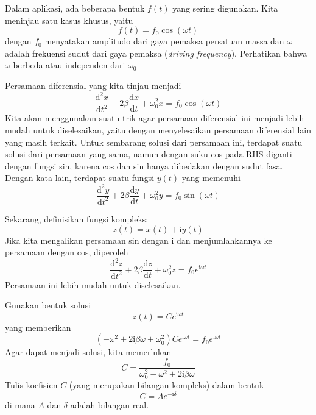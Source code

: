 Dalam aplikasi, ada beberapa bentuk $f(t)$ yang sering digunakan.
Kita meninjau satu kasus khusus, yaitu
\begin{equation}
f(t) = f_{0}\cos(\omega t)
\end{equation}
dengan $f_{0}$ menyatakan amplitudo dari gaya pemaksa persatuan massa
dan $\omega$ adalah frekuensi sudut dari gaya pemaksa (\textit{driving frequency}).
Perhatikan bahwa $\omega$ berbeda atau independen dari $\omega_0$

Persamaan diferensial yang kita tinjau menjadi
\begin{equation}
\frac{\mathrm{d}^{2}x}{\mathrm{d}t^{2}} + 
2\beta\frac{\mathrm{d}x}{\mathrm{d}t} + \omega_{0}^{2}x = f_{0}\cos(\omega t)
\end{equation}
Kita akan menggunakan suatu trik agar persamaan diferensial ini menjadi lebih
mudah untuk diselesaikan, yaitu dengan menyelesaikan persamaan diferensial
lain yang masih terkait.
Untuk sembarang solusi dari persamaan ini, terdapat suatu solusi dari
persamaan yang sama, namun dengan suku cos pada RHS diganti dengan
fungsi sin, karena cos dan sin hanya dibedakan dengan sudut fasa.
Dengan kata lain, terdapat suatu fungsi $y(t)$ yang memenuhi
\begin{equation*}
\frac{\mathrm{d}^{2}y}{\mathrm{d}t^{2}} +
2\beta\frac{\mathrm{d}y}{\mathrm{d}t} + \omega_{0}^{2}y = f_{0}\sin(\omega t)
\end{equation*}

Sekarang, definisikan fungsi kompleks:
\begin{equation*}
z(t) = x(t) + \mathrm{i}y(t)
\end{equation*}
Jika kita mengalikan persamaan sin dengan $\mathrm{i}$ dan menjumlahkannya
ke persamaan dengan cos, diperoleh
\begin{equation*}
\frac{\mathrm{d}^{2}z}{\mathrm{d}t^{2}} +
2\beta\frac{\mathrm{d}z}{\mathrm{d}t} + \omega_{0}^{2}z = f_{0}e^{\mathrm{i}\omega t}
\end{equation*}
Persamaan ini lebih mudah untuk diselesaikan.

Gunakan bentuk solusi
\begin{equation*}
z(t) = Ce^{\mathrm{i}\omega t}
\end{equation*}
yang memberikan
\begin{equation*}
(-\omega^{2}+2\mathrm{i}\beta\omega+\omega_{0}^{2})Ce^{\mathrm{i}\omega t}=f_{0}e^{\mathrm{i}\omega t}
\end{equation*}
Agar dapat menjadi solusi, kita memerlukan
\begin{equation*}
C = \frac{f_{0}}{\omega_{0}^{2} - \omega^{2} + 2\mathrm{i}\beta\omega}
\end{equation*}
Tulis koefisien $C$ (yang merupakan bilangan kompleks) dalam bentuk
\begin{equation*}
C = Ae^{-\mathrm{i}\delta}
\end{equation*}
di mana $A$ dan $\delta$ adalah bilangan real.

